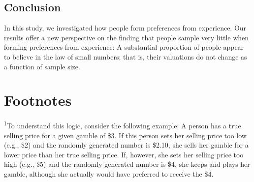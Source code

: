 \documentclass[a4paper,man, natbib]{apa6} %
\begin{document}

\subsection{Conclusion}
In this study, we investigated how people form  preferences from experience. Our results offer a new perspective on the finding that people sample very little when forming preferences from experience: A substantial proportion of people appear to believe in the law of small numbers; that is, their valuations do not change as a function of sample size. 





\newpage
\section{Footnotes}
\textsuperscript{1}To understand this logic, consider the following example: A person has a true selling price for a given gamble of \$3. If this person sets her selling price too low (e.g., \$2) and the randomly generated number is \$2.10, she sells her gamble for a lower price than her true selling price. If, however, she sets her selling price too high (e.g., \$5) and the randomly generated number is \$4, she keeps and plays her gamble, although she actually would have preferred to receive the \$4.
\end{document}
